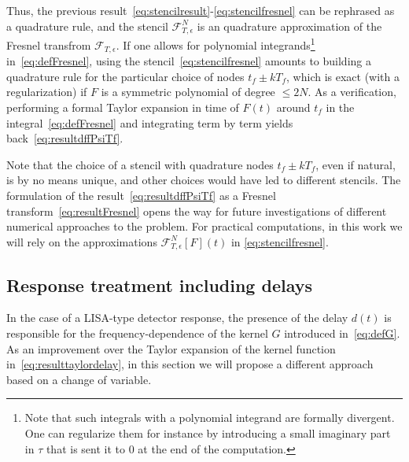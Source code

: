 \documentclass[aps,showpacs,twocolumn,
prd,superscriptaddress,nofootinbib]{revtex4-1}
\newcommand\calF{{\mathcal{F}}}
\newcommand{\tf}{t_{f}}
\newcommand{\Tf}{T_{f}}
\newcommand{\SM}[1]{{\color{Red} #1}}
\begin{document}
Thus, the previous result~\eqref{eq:stencilresult}-\eqref{eq:stencilfresnel} can be rephrased as a quadrature rule, and the stencil $\calF_{T, \epsilon}^{N}$ is an quadrature approximation of the Fresnel transfrom $\calF_{T, \epsilon}$. If one allows for polynomial integrands\footnote{Note that such integrals with a polynomial integrand are formally divergent. One can regularize them for instance by introducing a small imaginary part in $\tau$ that is sent it to $0$ at the end of the computation.} in~\eqref{eq:defFresnel}, using the stencil~\eqref{eq:stencilfresnel} amounts to building a quadrature rule for the particular choice of nodes $\tf \pm k \Tf$, which is exact (with a regularization) if $F$ is a symmetric polynomial of degree $\leq 2N$. As a verification, performing a formal Taylor expansion in time of $F(t)$ around $\tf$ in the integral~\eqref{eq:defFresnel} and integrating term by term yields back~\eqref{eq:resultdffPsiTf}.


Note that the choice of a stencil with quadrature nodes $\tf \pm k\Tf$, even if natural, is by no means unique, and other choices would have led to different stencils. The formulation of the result~\eqref{eq:resultdffPsiTf} as a Fresnel transform~\eqref{eq:resultFresnel} opens the way for future investigations of different numerical approaches to the problem. For practical computations, in this work we will rely on the approximations $\calF_{T, \epsilon}^{N}[F] (t)$ in \eqref{eq:stencilfresnel}.


\subsection{Response treatment including delays}
\label{subsec:delays}

In the case of a LISA-type detector response, the presence of the delay $d(t)$ is responsible for the frequency-dependence of the kernel $G$ introduced in~\eqref{eq:defG}. As an improvement over the Taylor expansion of the kernel function in~\eqref{eq:resulttaylordelay}, in this section we will propose a different approach based on a change of variable.
\end{document}
